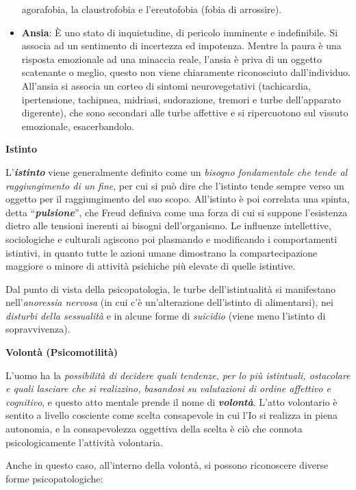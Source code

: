 \documentclass[]{article}
\begin{document}
\begin{itemize}
  agorafobia, la claustrofobia e l'ereutofobia (fobia di arrossire).
\item
  \textbf{Ansia}: È uno stato di inquietudine, di pericolo imminente e
  indefinibile. Si associa ad un sentimento di incertezza ed impotenza.
  Mentre la paura è una risposta emozionale ad una minaccia reale,
  l'ansia è priva di un oggetto scatenante o meglio, questo non viene
  chiaramente riconosciuto dall'individuo. All'ansia si associa un
  corteo di sintomi neurovegetativi (tachicardia, ipertensione,
  tachipnea, midriasi, sudorazione, tremori e turbe dell'apparato
  digerente), che sono secondari alle turbe affettive e si ripercuotono
  sul vissuto emozionale, esacerbandolo.
\end{itemize}

\textbf{Istinto}

L'\textbf{\emph{istinto}} viene generalmente definito come un
\emph{bisogno fondamentale che tende al raggiungimento di un fine}, per
cui si può dire che l'istinto tende sempre verso un oggetto per il
raggiungimento del suo scopo. All'istinto è poi correlata una spinta,
detta ``\textbf{\emph{pulsione}}'', che Freud definiva come una forza di
cui si suppone l'esistenza dietro alle tensioni inerenti ai bisogni
dell'organismo. Le influenze intellettive, sociologiche e culturali
agiscono poi plasmando e modificando i comportamenti istintivi, in
quanto tutte le azioni umane dimostrano la compartecipazione maggiore o
minore di attività psichiche più elevate di quelle istintive.

Dal punto di vista della psicopatologia, le turbe dell'istintualità si
manifestano nell'\emph{anoressia nervosa} (in cui c'è un'alterazione
dell'istinto di alimentarsi), nei \emph{disturbi della sessualità} e in
alcune forme di \emph{suicidio} (viene meno l'istinto di sopravvivenza).

\textbf{Volontà (Psicomotilità)}

L'uomo ha la \emph{possibilità di decidere quali tendenze, per lo più
istintuali, ostacolare e quali lasciare che si realizzino, basandosi su
valutazioni di ordine affettivo e cognitivo}, e questo atto mentale
prende il nome di \textbf{\emph{volontà}}. L'atto volontario è sentito a
livello cosciente come scelta consapevole in cui l'Io si realizza in
piena autonomia, e la consapevolezza oggettiva della scelta è ciò che
connota psicologicamente l'attività volontaria.

Anche in questo caso, all'interno della volontà, si possono riconoscere
diverse forme psicopatologiche:
\end{document}
